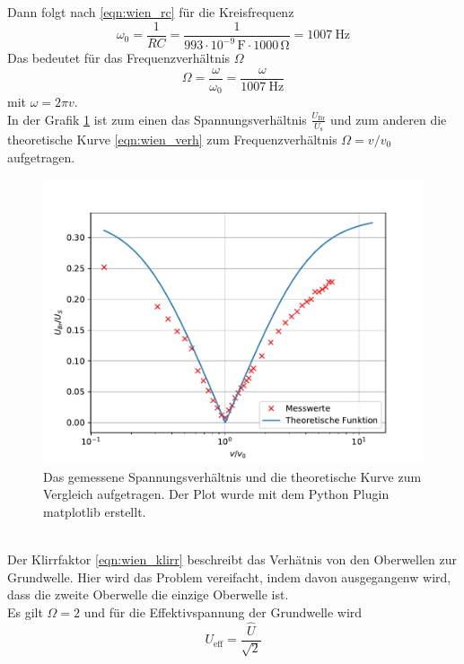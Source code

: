 Dann folgt nach \eqref{eqn:wien_rc} für die Kreisfrequenz
\begin{equation*}
  \omega_0 = \frac{1}{RC} = \frac{1}{993 \cdot 10^{-9}\, \si{\farad} \cdot 1000\, \si{\ohm}} = \SI{1007}{\hertz} 
\end{equation*}
Das bedeutet für das Frequenzverhältnis $\Omega$
\begin{equation*}
  \Omega = \frac{\omega}{\omega_0} = \frac{\omega}{\SI{1007}{\hertz}}
\end{equation*}
mit $\omega=2\pi v$.\\
In der Grafik \ref{fig:plot} ist zum einen das Spannungsverhältnis $\frac{U_\text{Br}}{U_\text{s}}$
und zum anderen die theoretische Kurve \eqref{eqn:wien_verh} zum Frequenzverhältnis $\Omega = v/v_0$ aufgetragen.
\begin{figure}
  \centering
  \includegraphics[width=\textwidth]{content/plot_e.pdf}
  \caption{Das gemessene Spannungsverhältnis und die theoretische Kurve zum Vergleich aufgetragen. Der Plot wurde mit dem Python Plugin matplotlib \cite{matplotlib} erstellt.}
  \label{fig:plot}
\end{figure}
\\
Der Klirrfaktor \eqref{eqn:wien_klirr} beschreibt das Verhätnis von den
Oberwellen zur Grundwelle. Hier wird das Problem vereifacht, indem davon ausgegangenw wird, dass
die zweite Oberwelle die einzige Oberwelle ist.\\
Es gilt $\Omega = 2$ und für die Effektivspannung der Grundwelle wird
\begin{equation*}
  U_\text{eff} = \frac{\hat{U}}{\sqrt{2}}
\end{equation*}
